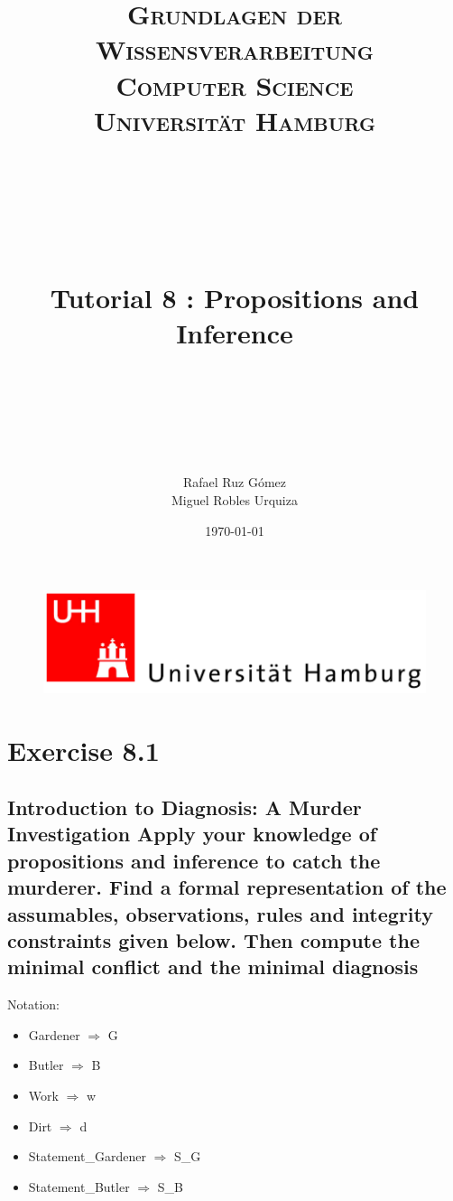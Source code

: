 \documentclass[paper=a4, fontsize=11pt]{scrartcl} %
\title{	
\normalfont \normalsize 
\textsc{\textbf{Grundlagen der Wissensverarbeitung} \\ Computer Science \\ Universität Hamburg} \\ [25pt] %
~\\
~\\
~\\
\horrule{0.5pt} \\[0.4cm] %
\Huge Tutorial 8 : Propositions and Inference\\ %
\horrule{2pt} \\[0.5cm] %
~\\
~\\
}
\author{Rafael Ruz Gómez\\Miguel Robles Urquiza} %
\date{\normalsize \today} %
\numberwithin{equation}{section} %
\numberwithin{figure}{section} %
\numberwithin{table}{section} %
\begin{document}
\maketitle %

\begin{figure}
	\centering
	\includegraphics[scale=0.8]{logo_uni_hamburg.png}
\end{figure}

\newpage %





\section*{Exercise 8.1}

\subsection*{Introduction to Diagnosis: A Murder Investigation
Apply your knowledge of propositions and inference to catch the murderer. Find a formal representation of the assumables, observations, rules and integrity constraints given below. Then compute the minimal conflict and the minimal diagnosis}

Notation:

\begin{itemize}

\item Gardener $\Rightarrow$ G
\item Butler $\Rightarrow$ B
\item Work $\Rightarrow$ w
\item Dirt $\Rightarrow$ d
\item Statement\_Gardener $\Rightarrow$ S\_G
\item Statement\_Butler $\Rightarrow$ S\_B

\end{itemize}
\end{document}
